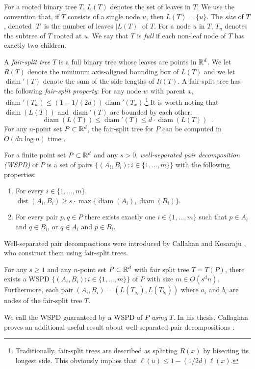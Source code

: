 \documentclass{patmorin}
\DeclareMathOperator{\diam}{diam}
\DeclareMathOperator{\dist}{dist}
\begin{document}
For a rooted binary tree $T$, $L(T)$ denotes the set of leaves in
$T$. We use the convention that, if $T$ consists of a single node $u$,
then $L(T)=\{u\}$. The \emph{size} of $T$, denoted $|T|$ is the number of
leaves $|L(T)|$ of $T$. For a node $u$ in $T$, $T_u$ denotes the subtree
of $T$ rooted at $u$.  We say that $T$ is \emph{full} if each non-leaf
node of $T$ has exactly two children.

A \emph{fair-split tree} $T$ is a full binary tree whose
leaves are points in $\mathbb{R}^d$.  We let $R(T)$ denote the minimum
axis-aligned bounding box of $L(T)$ and we let $\diam'(T)$ denote the
sum of the side lengths of $R(T)$.  A fair-split tree has the following
\emph{fair-split property}: For any node $w$ with parent $x$, $\diam'(T_w)
\le (1-1/(2d))\diam'(T_x)$.\footnote{Traditionally, fair-split trees
are described as splitting $R(x)$ by bisecting its longest side.
This obviously implies that $\ell(u)\le 1-(1/2d)\ell(x)$.} It is worth
noting that $\diam(L(T))$ and $\diam'(T)$ are bounded by each other:
\[
	\diam(L(T)) \le \diam'(T) \le d\cdot\diam(L(T)) \enspace .
\]	
For any
$n$-point set $P\subset\mathbb{R}^d$, the fair-split tree for $P$ can be computed
in $O(dn\log n)$ time \cite{callahan.kosaraju:decomposition}.

For a finite point set $P\subset\mathbb{R}^d$ and any $s>0$,
\emph{well-separated pair decomposition (WSPD)} of $P$ is a set of pairs
$\{(A_i,B_i):i\in\{1,\ldots,m\}\}$ with the following properties:
\begin{enumerate}
  \item For every $i\in\{1,\ldots,m\}$, 
    $\dist(A_i,B_i)\ge s\cdot\max\{\diam(A_i),\diam(B_i)\}$.
  \item For every pair $p,q\in P$ there exists exactly one
    $i\in\{1,\ldots,m\}$ such that $p\in A_i$ and $q\in B_i$, or $q\in A_i$
    and $p\in B_i$.
\end{enumerate}
Well-separated pair decompositions were introduced by Callahan and
Kosaraju \cite{callahan.kosaraju:decomposition}, who construct them
using fair-split trees.

\begin{thm}
  For any $s\ge 1$ and any $n$-point set $P\subset\mathbb{R}^d$ with fair
  split tree $T=T(P)$, there exists a WSPD
  $\{(A_i,B_i):i\in\{1,\ldots,m\}\}$ of $P$ with size $m\in O(s^d n)$.
  Furthermore, each pair $(A_i,B_i)=(L(T_{a_i}),L(T_{b_i}))$ where $a_i$
  and $b_i$ are nodes of the fair-split tree $T$.
\end{thm}
We call the WSPD guaranteed by  a WSPD of $P$ \emph{using}
$T$.  In his thesis, Callaghan proves an additional useful result about
well-separated pair decompositions \cite[Lemma~4.5]{callahan:dealing}:
\end{document}
